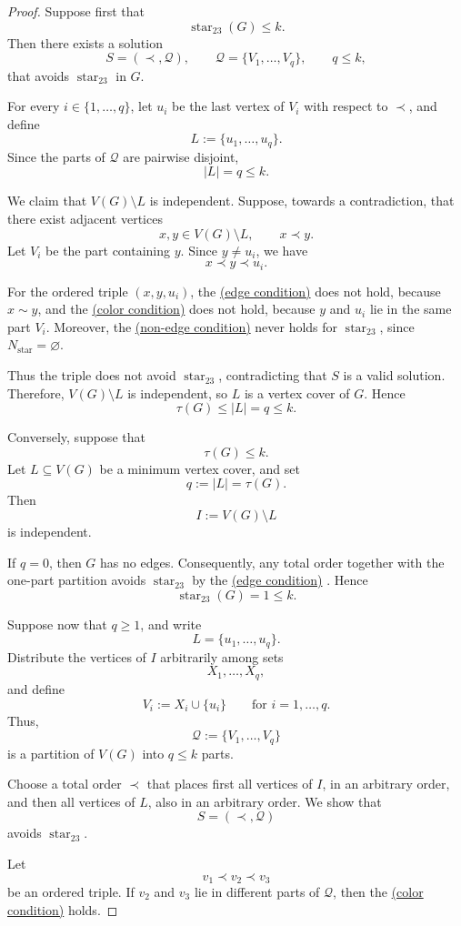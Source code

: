 \documentclass[12pt]{article}
\theoremstyle{plain}
\theoremstyle{definition}
\theoremstyle{remark}
\theoremstyle{definition}
\newcommand{\edgecondition}{%
  \hyperref[def:avoid:cond:edge]{(edge condition)}\xspace
}
\newcommand{\nonedgecondition}{%
  \hyperref[def:avoid:cond:nonedge]{(non-edge condition)}\xspace
}
\newcommand{\colorcondition}{%
  \hyperref[def:avoid:cond:color]{(color condition)}\xspace
}
\newcommand{\starlabel}{\mathrm{star}}
\DeclareRobustCommand{\starparam}[1]{%
  \ensuremath{\mathop{\starlabel}\nolimits_{#1}}%
}
\begin{document}
\begin{proof}
Suppose first that
\[
\starparam{23}(G)\le k.
\]
Then there exists a solution
\[
S=(\prec,\mathcal Q),
\qquad
\mathcal Q=\{V_1,\dots,V_q\},
\qquad
q\le k,
\]
that avoids \(\starparam{23}\) in \(G\).

For every \(i\in\{1,\dots,q\}\), let \(u_i\) be the last vertex of \(V_i\)
with respect to \(\prec\), and define
\[
L:=\{u_1,\dots,u_q\}.
\]
Since the parts of \(\mathcal Q\) are pairwise disjoint,
\[
|L|=q\le k.
\]

We claim that \(V(G)\setminus L\) is independent. Suppose, towards a
contradiction, that there exist adjacent vertices
\[
x,y\in V(G)\setminus L,
\qquad
x\prec y.
\]
Let \(V_i\) be the part containing \(y\). Since \(y\neq u_i\), we have
\[
x\prec y\prec u_i.
\]

For the ordered triple \((x,y,u_i)\), the \edgecondition{} does not hold,
because \(x\sim y\), and the \colorcondition{} does not hold, because
\(y\) and \(u_i\) lie in the same part \(V_i\). Moreover, the
\nonedgecondition{} never holds for \(\starparam{23}\), since
\(N_{\starlabel}=\varnothing\).

Thus the triple does not avoid \(\starparam{23}\), contradicting that
\(S\) is a valid solution. Therefore, \(V(G)\setminus L\) is independent,
so \(L\) is a vertex cover of \(G\). Hence
\[
\tau(G)\le |L|=q\le k.
\]

Conversely, suppose that
\[
\tau(G)\le k.
\]
Let \(L\subseteq V(G)\) be a minimum vertex cover, and set
\[
q:=|L|=\tau(G).
\]
Then
\[
I:=V(G)\setminus L
\]
is independent.

If \(q=0\), then \(G\) has no edges. Consequently, any total order together
with the one-part partition avoids \(\starparam{23}\) by the
\edgecondition{}. Hence
\[
\starparam{23}(G)=1\le k.
\]

Suppose now that \(q\ge 1\), and write
\[
L=\{u_1,\dots,u_q\}.
\]
Distribute the vertices of \(I\) arbitrarily among sets
\[
X_1,\dots,X_q,
\]
and define
\[
V_i:=X_i\cup\{u_i\}
\qquad
\text{for }i=1,\dots,q.
\]
Thus,
\[
\mathcal Q:=\{V_1,\dots,V_q\}
\]
is a partition of \(V(G)\) into \(q\le k\) parts.





Choose a total order \(\prec\) that places first all vertices of \(I\), in
an arbitrary order, and then all vertices of \(L\), also in an arbitrary
order. We show that
\[
S=(\prec,\mathcal Q)
\]
avoids \(\starparam{23}\).

Let
\[
v_1\prec v_2\prec v_3
\]
be an ordered triple. If \(v_2\) and \(v_3\) lie in different parts of
\(\mathcal Q\), then the \colorcondition{} holds.


\end{proof}
\end{document}
